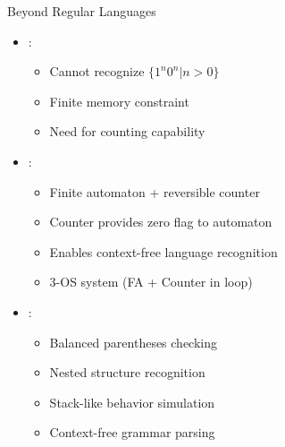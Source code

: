 \begin{frame}{Beyond Regular Languages}
\begin{itemize}
\item {}:
\begin{itemize}
\item Cannot recognize $\{1^n0^n | n > 0\}$
\item Finite memory constraint
\item Need for counting capability
\end{itemize}
\vspace{0.5cm}
\item {}:
\begin{itemize}
\item Finite automaton + reversible counter
\item Counter provides zero flag to automaton
\item Enables context-free language recognition
\item 3-OS system (FA + Counter in loop)
\end{itemize}
\vspace{0.3cm}
\item {}:
\begin{itemize}
\item Balanced parentheses checking
\item Nested structure recognition
\item Stack-like behavior simulation
\item Context-free grammar parsing
\end{itemize}
\end{itemize}
\end{frame}

